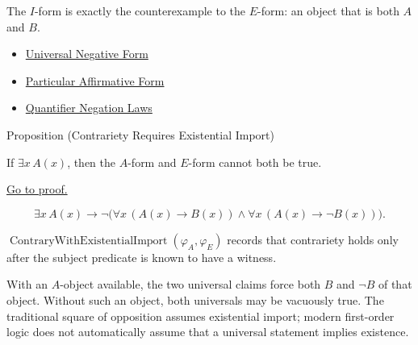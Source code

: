 \begin{remark*}[Interpretation]
The \(I\)-form is exactly the counterexample to the \(E\)-form: an object that
is both \(A\) and \(B\).
\end{remark*}

\begin{dependencies}
\begin{itemize}
  \item \hyperref[def:categorical-e-form-predicate-logic]{Universal Negative Form}
  \item \hyperref[def:categorical-i-form-predicate-logic]{Particular Affirmative Form}
  \item \hyperref[thm:qneg]{Quantifier Negation Laws}
\end{itemize}
\end{dependencies}

\begin{propositionbox}{Proposition (Contrariety Requires Existential Import)}
\begin{proposition}
\label{prop:existential-import-contrariety-predicate-logic}
If \(\exists x\,A(x)\), then the \(A\)-form and \(E\)-form cannot both be true.

\noindent\hyperref[prf:existential-import-contrariety-predicate-logic]{Go to proof.}
\end{proposition}
\end{propositionbox}

\begin{remark*}
\[
\exists x\,A(x)
\to
\neg\bigl(
  \forall x\,(A(x)\to B(x))
  \land
  \forall x\,(A(x)\to \neg B(x))
\bigr).
\]
\end{remark*}

\begin{remark*}
\(\operatorname{ContraryWithExistentialImport}(\varphi_A,\varphi_E)\) records
that contrariety holds only after the subject predicate is known to have a
witness.
\end{remark*}

\begin{remark*}[Interpretation]
With an \(A\)-object available, the two universal claims force both \(B\) and
\(\neg B\) of that object. Without such an object, both universals may be
vacuously true. The traditional square of opposition assumes existential
import; modern first-order logic does not automatically assume that a universal
statement implies existence.
\end{remark*}

